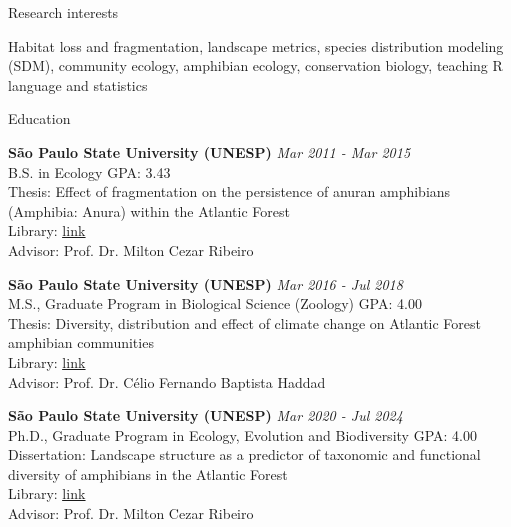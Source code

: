 \documentclass{resume}
\begin{document}

\begin{rSection}{Research interests}

Habitat loss and fragmentation, landscape metrics, species distribution modeling (SDM), community ecology, amphibian ecology, conservation biology, teaching R language and statistics

\end{rSection}


\begin{rSection}{Education}

{\bf São Paulo State University (UNESP)} \hfill {\em Mar 2011 - Mar 2015}\\
B.S. in Ecology\hfill { GPA: 3.43 }\\
Thesis: Effect of fragmentation on the persistence of anuran amphibians (Amphibia: Anura) within the Atlantic Forest\\
Library: \href{http://hdl.handle.net/11449/138991}{\underline{link}}\\
Advisor: Prof. Dr. Milton Cezar Ribeiro

{\bf São Paulo State University (UNESP)} \hfill {\em Mar 2016 - Jul 2018}\\
M.S., Graduate Program in Biological Science (Zoology)\hfill { GPA: 4.00 }\\
Thesis: Diversity, distribution and effect of climate change on Atlantic Forest amphibian communities\\
Library: \href{http://hdl.handle.net/11449/154993}{\underline{link}}\\
Advisor: Prof. Dr. Célio Fernando Baptista Haddad

{\bf São Paulo State University (UNESP)} \hfill {\em Mar 2020 - Jul 2024}\\
Ph.D., Graduate Program in Ecology, Evolution and Biodiversity \hfill { GPA: 4.00 }\\Dissertation: Landscape structure as a predictor of taxonomic and functional diversity of amphibians in the Atlantic Forest\\
Library: \href{https://hdl.handle.net/11449/256726}{\underline{link}}\\
Advisor: Prof. Dr. Milton Cezar Ribeiro

\end{rSection}
\end{document}
